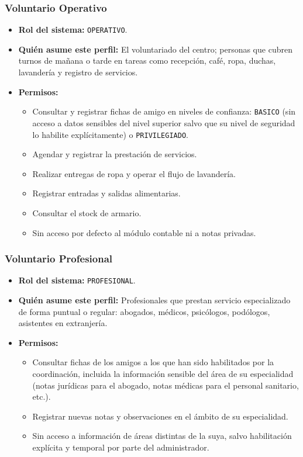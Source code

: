 \subsubsection{Voluntario Operativo}
\begin{itemize}
    \item \textbf{Rol del sistema:} \texttt{OPERATIVO}.
    
    \item \textbf{Quién asume este perfil:} El voluntariado del centro;
    personas que cubren turnos de mañana o tarde en tareas como recepción,
    café, ropa, duchas, lavandería y registro de servicios.
    
    \item \textbf{Permisos:}
    \begin{itemize}
        \item Consultar y registrar fichas de amigo en niveles de confianza: \texttt{BASICO} (sin
        acceso a datos sensibles del nivel superior salvo que su nivel de seguridad lo
        habilite explícitamente) o \texttt{PRIVILEGIADO}.
        \item Agendar y registrar la prestación de servicios.
        \item Realizar entregas de ropa y operar el flujo de lavandería.
        \item Registrar entradas y salidas alimentarias.
        \item Consultar el stock de armario.
        \item Sin acceso por defecto al módulo contable ni a notas privadas.
    \end{itemize}
\end{itemize}


\subsubsection{Voluntario Profesional}
\begin{itemize}
    \item \textbf{Rol del sistema:} \texttt{PROFESIONAL}.
    
    \item \textbf{Quién asume este perfil:} Profesionales que prestan servicio
    especializado de forma puntual o regular: abogados, médicos, psicólogos,
    podólogos, asistentes en extranjería.
    
    \item \textbf{Permisos:}
    \begin{itemize}
        \item Consultar fichas de los amigos a los que han sido habilitados por la
        coordinación, incluida la información sensible del área de su
        especialidad (notas jurídicas para el abogado, notas médicas para el
        personal sanitario, etc.).
        \item Registrar nuevas notas y observaciones en el ámbito de su especialidad.
        \item Sin acceso a información de áreas distintas de la suya, salvo
        habilitación explícita y temporal por parte del administrador.
    \end{itemize}
\end{itemize}


